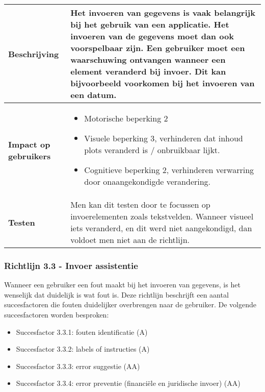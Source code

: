 \begin{table}[H]
\begin{tabular}{|l|p{12cm}|}
        \hline
        \textbf{Beschrijving}                 & Het invoeren van gegevens is vaak belangrijk bij het gebruik van een applicatie. Het invoeren van de gegevens moet dan ook voorspelbaar zijn. Een gebruiker moet een waarschuwing ontvangen wanneer een element veranderd bij invoer. Dit kan bijvoorbeeld voorkomen bij het invoeren van een datum.  \\ 
        \hline
        \textbf{Impact op gebruikers}         &  
        \begin{itemize}
            \item Motorische beperking 2
            \item Visuele beperking 3, verhinderen dat inhoud plots veranderd is / onbruikbaar lijkt.
            \item Cognitieve beperking 2, verhinderen verwarring door onaangekondigde verandering.
        \end{itemize}                                                                                                                                                                                                                                                                                                     \\ 
        
        \hline
        \textbf{Testen}                       & Men kan dit testen door te focussen op invoerelementen zoals tekstvelden. Wanneer visueel iets veranderd, en dit werd niet aangekondigd, dan voldoet men niet aan de richtlijn.                       \\
        \hline
    \end{tabular}
    
\end{table}
\newpage
\subsubsection{Richtlijn 3.3 - Invoer assistentie}
Wanneer een gebruiker een fout maakt bij het invoeren van gegevens, is het wenselijk dat duidelijk is wat fout is. Deze richtlijn beschrijft een aantal succesfactoren die fouten duidelijker overbrengen naar de gebruiker. De volgende succesfactoren worden besproken: \begin{itemize}
    \item Succesfactor 3.3.1: fouten identificatie (A)
         \item Succesfactor 3.3.2: labels of instructies (A)
    \item Succesfactor 3.3.3: error suggestie (AA)
        \item Succesfactor 3.3.4: error preventie (financiële en juridische invoer) (AA)
\end{itemize}

